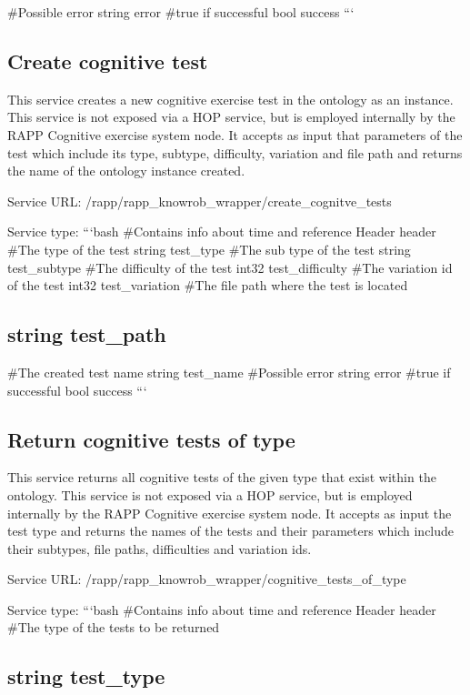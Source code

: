 \#\-Possible error string error \#true if successful bool success ```

\subsection*{Create cognitive test}

This service creates a new cognitive exercise test in the ontology as an instance. This service is not exposed via a H\-O\-P service, but is employed internally by the R\-A\-P\-P Cognitive exercise system node. It accepts as input that parameters of the test which include its type, subtype, difficulty, variation and file path and returns the name of the ontology instance created.

Service U\-R\-L\-: {\ttfamily /rapp/rapp\-\_\-knowrob\-\_\-wrapper/create\-\_\-cognitve\-\_\-tests}

Service type\-: ```bash \#\-Contains info about time and reference Header header \#\-The type of the test string test\-\_\-type \#\-The sub type of the test string test\-\_\-subtype \#\-The difficulty of the test int32 test\-\_\-difficulty \#\-The variation id of the test int32 test\-\_\-variation \#\-The file path where the test is located \subsection*{string test\-\_\-path }

\#\-The created test name string test\-\_\-name \#\-Possible error string error \#true if successful bool success ```

\subsection*{Return cognitive tests of type}

This service returns all cognitive tests of the given type that exist within the ontology. This service is not exposed via a H\-O\-P service, but is employed internally by the R\-A\-P\-P Cognitive exercise system node. It accepts as input the test type and returns the names of the tests and their parameters which include their subtypes, file paths, difficulties and variation ids.

Service U\-R\-L\-: {\ttfamily /rapp/rapp\-\_\-knowrob\-\_\-wrapper/cognitive\-\_\-tests\-\_\-of\-\_\-type}

Service type\-: ```bash \#\-Contains info about time and reference Header header \#\-The type of the tests to be returned \subsection*{string test\-\_\-type }

